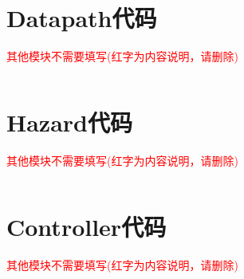 \appendix
\section{Datapath代码}
\textcolor{red}{其他模块不需要填写(红字为内容说明，请删除)}
\begin{lstlisting}[language=Verilog]

\end{lstlisting}

\section{Hazard代码}
\textcolor{red}{其他模块不需要填写(红字为内容说明，请删除)}
\begin{lstlisting}[language=Verilog]

\end{lstlisting}

\section{Controller代码}
\textcolor{red}{其他模块不需要填写(红字为内容说明，请删除)}
\begin{lstlisting}[language=Verilog]

\end{lstlisting}